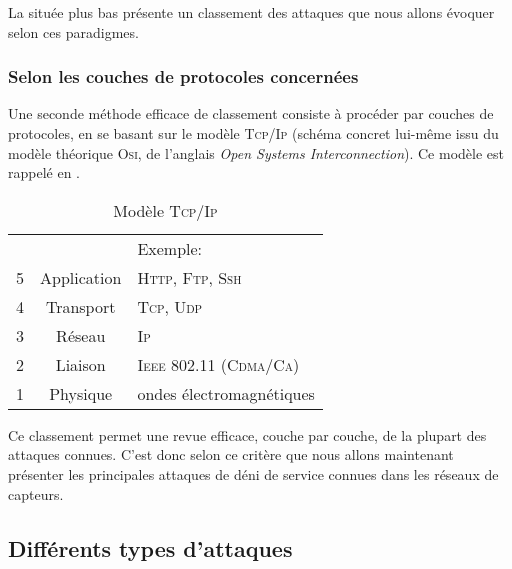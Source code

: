 La  située plus bas présente un classement des attaques que nous allons évoquer selon ces paradigmes.

\subsubsection{Selon les couches de protocoles concernées}
Une seconde méthode efficace de classement consiste à procéder par couches de protocoles, en se basant sur le modèle \textsc{Tcp/Ip} (schéma concret lui-même issu du modèle théorique \textsc{Osi}, de l'anglais \textit{Open Systems Interconnection}).
Ce modèle est rappelé en .
\begin{table}[!ht]
    \centering
    \begin{tabular}{c |c| l}
        \multicolumn{2}{c}{} & Exemple:\\
        \cline{2-2}
        5 & Application & \textsc{Http, Ftp, Ssh}\\
        \cline{2-2}
        4 & Transport & \textsc{Tcp, Udp}\\
        \cline{2-2}
        3 & Réseau & \textsc{Ip}\\
        \cline{2-2}
        2 & Liaison & \textsc{Ieee 802.11 (Cdma/Ca)}\\
        \cline{2-2}
        1 & Physique & ondes électromagnétiques\\
        \cline{2-2}
     \end{tabular}
    \medskip
    \caption{Modèle \textsc{Tcp/Ip}}\label{ea:fig:tcpip}
\end{table}

Ce classement permet une revue efficace, couche par couche, de la plupart des attaques connues.
C'est donc selon ce critère que nous allons maintenant présenter les principales attaques de déni de service connues dans les réseaux de capteurs.

\subsection{Différents types d'attaques}



